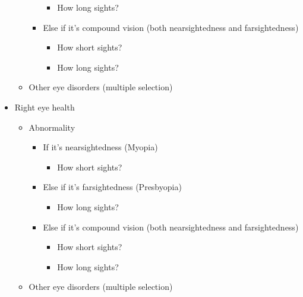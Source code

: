 \begin{multicols}{2}
\begin{itemize}
\begin{itemize}
\begin{itemize}
                \begin{itemize}
                    \item How long sights?
                \end{itemize}
                \item Else if it's compound vision (both nearsightedness and farsightedness)
                \begin{itemize}
                    \item How short sights?
                    \item How long sights?
                \end{itemize}
            \end{itemize}
            \item Other eye disorders (multiple selection)
        \end{itemize}
        \item Right eye health
        \begin{itemize}
            \item Abnormality
            \begin{itemize}
                \item If it's nearsightedness (Myopia)
                \begin{itemize}
                    \item How short sights?
                \end{itemize}
                \item Else if it's farsightedness (Presbyopia)
                \begin{itemize}
                    \item How long sights?
                \end{itemize}
                \item Else if it's compound vision (both nearsightedness and farsightedness)
                \begin{itemize}
                    \item How short sights?
                    \item How long sights?
                \end{itemize}
            \end{itemize}
            \item Other eye disorders (multiple selection)
        \end{itemize}
    \end{itemize}
\end{multicols}
\lipsum[19-20]